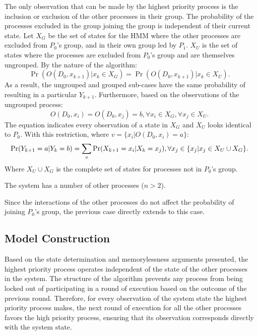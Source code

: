 \begin{prooftight}
The only observation that can be made by the highest priority process is the inclusion or exclusion of the other processes in their group.
The probability of the processes excluded in the group joining the group is independent of their current state.
Let $X_G$ be the set of states for the \ac{HMM} where the other processes are excluded from $P_0$'s group, and in their own group led by $P_1$.
$X_U$ is the set of states where the processes are excluded from $P_0$'s group and are themselves ungrouped.
By the nature of the algorithm: 
\begin{equation}
\Pr(O(D_0, x_{k+1}) | x_k \in X_G) = \Pr(O(D_0, x_{k+1}) | x_k \in X_U).
\label{eq:sameprob}
\end{equation}
As a result, the ungrouped and grouped sub-cases have the same probability of resulting in a particular $Y_{k+1}$.
Furthermore, based on the observations of the ungrouped process:
\begin{equation}
O(D_0, x_i) = O(D_0, x_j) = b, \forall x_i \in X_G, \forall x_j \in X_U.
\end{equation}
The equation indicates every observation of a state in $X_G$ and $X_U$ looks identical to $P_0$.
With this restriction, where $v=\{x_{i} | O(D_0, x_{i}) = a\}$:
\begin{equation}
    \Pr(Y_{k+1}=a | Y_{k}=b) = \sum_{v} \Pr(X_{k+1}=x_i | X_{k}=x_j), \forall x_j \in \{x_j | x_j \in X_U \cup X_G\}.
    \vspace{6pt}
\end{equation}
Where $X_U \cup X_G$ is the complete set of states for processes not in $P_0$'s group.

\begin{case}
    The system has a number of other processes ($n > 2$).
\end{case}
Since the interactions of the other processes do not affect the probability of joining $P_0$'s group, the previous case directly extends to this case.
\end{prooftight}

\subsection{Model Construction}

Based on the state determination and memorylessness arguments presented, the highest priority process operates independent of the state of the other processes in the system.
The structure of the algorithm prevents any process from being locked out of participating in a round of execution based on the outcome of the previous round.
Therefore, for every observation of the system state the highest priority process makes, the next round of execution for all the other processes favors the high priority process, ensuring that its observation corresponds directly with the system state.

